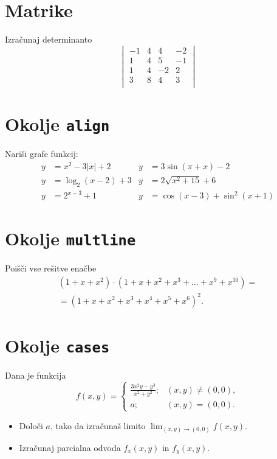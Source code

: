 \documentclass[a4paper,12pt]{article}
\begin{document}
\section*{Matrike}
Izračunaj determinanto
\[
\begin{vmatrix}
      -1 & 4 & 4 & -2 \\
      1 & 4 & 5 & -1 \\
      1 & 4 & -2 & 2 \\
      3 & 8 & 4 & 3 \\
\end{vmatrix}
\]

\section*{Okolje \texttt{align}}
Nariši grafe funkcij:
\begin{align*}
y &= x^2 - 3|x| + 2        &     y &= 3 \sin(\pi+x) - 2 \\
y &= \log_2(x-2) + 3       &     y &= 2 \sqrt{x^2+15} + 6 \\
y &= 2^{x-3} + 1           &     y &= \cos(x-3) + \sin^2(x+1)
\end{align*}


\section*{Okolje \texttt{multline}}
Poišči vse rešitve enačbe
\begin{multline*}
(1+x+x^2) \cdot (1+x+x^2+x^3+\ldots+x^9+x^{10}) = \\
=(1+x+x^2+x^3+x^4+x^5+x^6)^2.
\end{multline*}

\section*{Okolje \texttt{cases}}
Dana je funkcija
\[
f(x,y)=\begin{cases}
   \frac{3x^2y-y^3}{x^2+y^2}; & (x,y)\neq(0,0), \\
   a; & (x,y)=(0,0).
\end{cases}
\]
\begin{itemize}
\item Določi \(a\), tako da izračunaš limito \( \lim_{(x,y)\to(0,0)} f(x,y) \).
\item Izračunaj parcialna odvoda \(f_x(x,y)\) in \(f_y(x,y)\).
\end{itemize}
\end{document}
